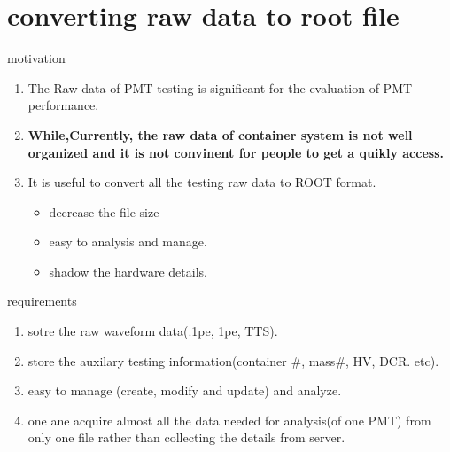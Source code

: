 
\section{converting raw data to root file}
\begin{frame}{ motivation}
\begin{enumerate}
\item 	The Raw data of PMT testing is significant for the evaluation of PMT performance. 
\item \textbf{While,Currently, the raw data of container system is not well organized and it is  not convinent for people to get a quikly access.  }
\item \alert{It is useful to convert all the testing raw data to ROOT format.}
\begin{itemize}
\item decrease the file size
\item easy to analysis and manage.
\item shadow the hardware details.
\end{itemize}
\end{enumerate}
\end{frame}
\begin{frame}{requirements}
\begin{enumerate}
\item sotre the raw waveform data(.1pe, 1pe, TTS).
\item store the auxilary testing information(container #, mass#, HV, DCR. etc).
\item easy to manage (create, modify and update) and analyze.
\item \alert{one ane acquire almost all the data needed for analysis(of one PMT) from only one file} rather than collecting the details from server.

\end{enumerate}
\end{frame}
